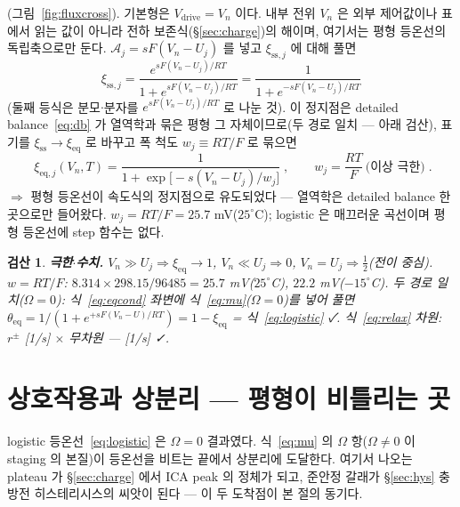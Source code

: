 \documentclass[11pt,a4paper]{article}
\newtheorem*{verifybox}{검산}
\newcommand{\eq}{\mathrm{eq}}
\newcommand{\drive}{\mathrm{drive}}
\newcommand{\sstat}{\mathrm{ss}}
\begin{document}
(그림~\ref{fig:fluxcross}). 기본형은 $V_\drive=V_n$ 이다. 내부 전위 $V_n$ 은 외부 제어값이나 표에서 읽는 값이 아니라 전하 보존식(\S\ref{sec:charge})의 해이며, 여기서는 평형 등온선의 독립축으로만 둔다. $\mathcal A_j=sF(V_n-U_j)$ 를 넣고 $\xi_{\sstat,j}$ 에 대해 풀면
\begin{equation}
\xi_{\sstat,j}
=\frac{e^{sF(V_n-U_j)/RT}}{1+e^{sF(V_n-U_j)/RT}}
=\frac{1}{1+e^{-sF(V_n-U_j)/RT}}
\label{eq:logisticsolve}
\end{equation}
(둘째 등식은 분모$\cdot$분자를 $e^{sF(V_n-U_j)/RT}$ 로 나눈 것). 이 정지점은 detailed balance~\eqref{eq:db} 가 열역학과 묶은 평형 그 자체이므로(두 경로 일치 — 아래 검산), 표기를 $\xi_{\sstat}\to\xi_{\eq}$ 로 바꾸고 폭 척도 $w_j\equiv RT/F$ 로 묶으면
\begin{equation}
\boxed{\;\xi_{\eq,j}(V_n,T)=\frac{1}{1+\exp\!\big[-s(V_n-U_j)/w_j\big]}\;,\qquad
w_j=\frac{RT}{F}\ \text{(이상 극한)}\;.}
\label{eq:logistic}
\end{equation}
$\Rightarrow$ 평형 등온선이 속도식의 정지점으로 유도되었다 — 열역학은 detailed balance 한 곳으로만 들어왔다. $w_j=RT/F=25.7$ mV($25^\circ$C); logistic 은 매끄러운 곡선이며 평형 등온선에 step 함수는 없다.

\begin{verifybox}
\textbf{극한$\cdot$수치.} $V_n\gg U_j\Rightarrow\xi_{\eq}\to1$, $V_n\ll U_j\Rightarrow0$, $V_n=U_j\Rightarrow\tfrac12$(전이 중심). $w=RT/F$: $8.314\times298.15/96485=25.7$ mV($25^\circ$C), $22.2$ mV($-15^\circ$C). 두 경로 일치($\Omega=0$): 식~\eqref{eq:eqcond} 좌변에 식~\eqref{eq:mu}($\Omega=0$)를 넣어 풀면 $\theta_{\eq}=1/(1+e^{+sF(V_n-U)/RT})=1-\xi_{\eq}$ = 식~\eqref{eq:logistic} ✓. 식~\eqref{eq:relax} 차원: $r^\pm$ [1/s] $\times$ 무차원 — [1/s] ✓.
\end{verifybox}

\section{상호작용과 상분리 — 평형이 비틀리는 곳}\label{sec:regsol}
logistic 등온선~\eqref{eq:logistic} 은 $\Omega=0$ 결과였다. 식~\eqref{eq:mu} 의 $\Omega$ 항($\Omega\ne0$ 이 staging 의 본질)이 등온선을 비트는 끝에서 상분리에 도달한다. 여기서 나오는 plateau 가 \S\ref{sec:charge} 에서 ICA peak 의 정체가 되고, 준안정 갈래가 \S\ref{sec:hys} 충방전 히스테리시스의 씨앗이 된다 — 이 두 도착점이 본 절의 동기다.
\end{document}
